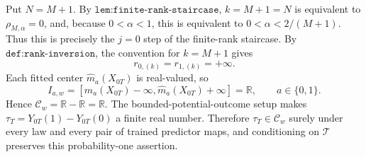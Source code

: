 Put \(N=M+1\). By \(\texttt{lem:finite-rank-staircase}\), \(k=M+1=N\) is equivalent to \(\rho_{M,\alpha}=0\), and, because \(0<\alpha<1\), this is equivalent to \(0<\alpha<2/(M+1)\). Thus this is precisely the \(j=0\) step of the finite-rank staircase. By \(\texttt{def:rank-inversion}\), the convention for \(k=M+1\) gives \[r_{0,(k)}=r_{1,(k)}=+\infty.\] Each fitted center \(\widehat m_a(X_{0T})\) is real-valued, so \[I_{a,w}=[\widehat m_a(X_{0T})-\infty,\widehat m_a(X_{0T})+\infty]=\mathbb R,\qquad a\in\{0,1\}.\] Hence \(\mathcal C_w=\mathbb R-\mathbb R=\mathbb R\). The bounded-potential-outcome setup makes \(\tau_T=Y_{0T}(1)-Y_{0T}(0)\) a finite real number. Therefore \(\tau_T\in\mathcal C_w\) surely under every law and every pair of trained predictor maps, and conditioning on \(\mathcal T\) preserves this probability-one assertion.